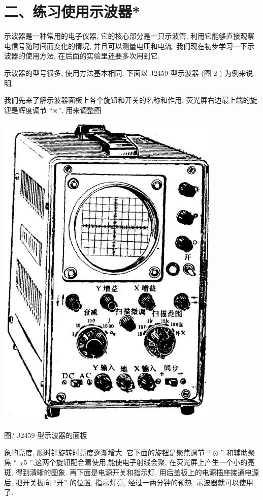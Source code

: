 \documentclass[10pt]{article}
\begin{document}
\section*{二、练习使用示波器*}

示波器是一种常用的电子仪器, 它的核心部分是一只示波管, 利用它能够直接观察电信号随时间而变化的情况, 并且可以测量电压和电流. 我们现在初步学习一下示波器的使用方法, 在后面的实验里还要多次用到它.

示波器的型号很多, 使用方法基本相同. 下面以 J2459 型示波器 (图 2 ) 为例来说明.

我们先来了解示波器面板上各个旋钮和开关的名称和作用. 荧光屏右边最上端的旋钮是辉度调节 “※”, 用来调整图

\begin{center}
\includegraphics[max width=0.8\textwidth]{images/01913056-1f15-74d8-9184-9aab52c9d66b_372_955002.jpg}
\end{center}

图? J2459 型示波器的面板

象的亮度, 顺时针旋转时亮度逐渐增大. 它下面的旋钮是聚焦调节 “ \(\odot\) ” 和辅助聚焦 “ \(\mathbin{\chi 5}\) ”,这两个旋钮配合着使用,能使电子射线会聚, 在荧光屏上产生一个小的亮斑, 得到清晰的图象. 再下面是电源开关和指示灯, 用后盖板上的电源插座接通电源后, 把开关扳向 “开” 的位置, 指示灯亮, 经过一两分钟的预热, 示波器就可以使用了.
\end{document}
